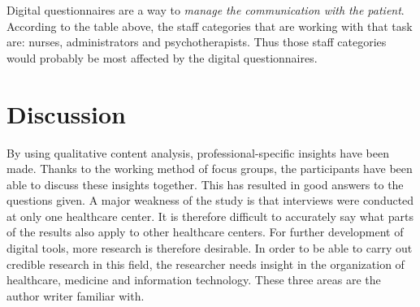 \documentclass[12pt,a4paper,oneside]{article}
\let\oldcite\cite
\renewcommand*\cite[1]{\textsuperscript{\oldcite{#1}}}
\begin{document}
\newpage
Digital questionnaires are a way to {\it manage the communication with the patient}. According to the table above, the staff categories that are working with that task are: nurses, administrators and psychotherapists. Thus those staff categories would probably be most affected by the digital questionnaires.

\section*{Discussion}
By using qualitative content analysis, professional-specific insights have been made. Thanks to the working method of focus groups, the participants have been able to discuss these insights together. This has resulted in good answers to the questions given. A major weakness of the study is that interviews were conducted at only one healthcare center. It is therefore difficult to accurately say what parts of the results also apply to other healthcare centers. For further development of digital tools, more research is therefore desirable. In order to be able to carry out credible research in this field, the researcher needs insight in the organization of healthcare, medicine and information technology. These three areas are the author writer familiar with.
\end{document}
